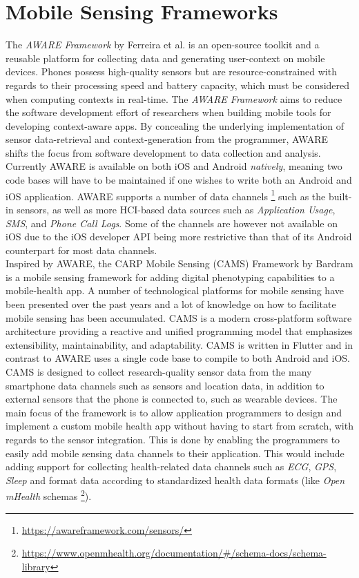\section{Mobile Sensing Frameworks}
The \textit{AWARE Framework} by Ferreira et al. \cite{aware2015} is an open-source toolkit and a reusable platform for collecting data and generating user-context on mobile devices. Phones possess high-quality sensors but are resource-constrained with regards to their processing speed and battery capacity, which must be considered when computing contexts in real-time. The \textit{AWARE Framework} aims to reduce the software development effort of researchers when building mobile tools for developing context-aware apps. By concealing the underlying implementation of sensor data-retrieval and context-generation from the programmer, AWARE shifts the focus from software development to data collection and analysis. Currently AWARE is available on both iOS and Android \textit{natively}, meaning two code bases will have to be maintained if one wishes to write both an Android and iOS application. AWARE supports a number of data channels \footnote{\url{https://awareframework.com/sensors/}} such as the built-in sensors, as well as more HCI-based data sources such as \textit{Application Usage}, \textit{SMS}, and \textit{Phone Call Logs}. Some of the channels are however not available on iOS due to the iOS developer API being more restrictive than that of its Android counterpart for most data channels.\\

Inspired by AWARE, the CARP Mobile Sensing (CAMS) Framework by Bardram \cite{CAMS} is a mobile sensing framework for adding digital phenotyping capabilities to a mobile-health app. A number of technological platforms for mobile sensing have been presented over the past years and a lot of knowledge on how to facilitate mobile sensing has been accumulated. CAMS is a modern cross-platform software architecture providing a reactive and unified programming model that emphasizes extensibility, maintainability, and adaptability. CAMS is written in Flutter and in contrast to AWARE uses a single code base to compile to both Android and iOS.\\

CAMS is designed to collect research-quality sensor data from the many smartphone data channels such as sensors and location data, in addition to external sensors that the phone is connected to, such as wearable devices. The main focus of the framework is to allow application programmers to design and implement a custom mobile health app without having to start from scratch, with regards to the sensor integration. This is done by enabling the programmers to easily add mobile sensing data channels to their application. This would include adding support for collecting health-related data channels such as \textit{ECG}, \textit{GPS}, \textit{Sleep} and format data according to standardized health data formats (like \textit{Open mHealth} schemas \footnote{\url{https://www.openmhealth.org/documentation/#/schema-docs/schema-library}}). \\

